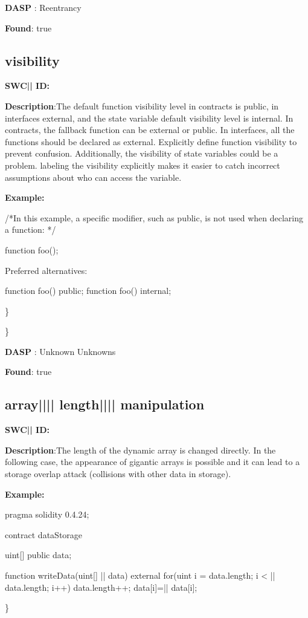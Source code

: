 \documentclass{article}
\begin{document}
\textbf{DASP} : Reentrancy

\textbf{Found}: true

\subsection{visibility} 
\textbf{SWC{|\textunderscore| }ID:} 

\textbf{Description}:The default function visibility level in contracts is public, in interfaces {\textendash} external,  and the state variable default visibility level is internal. In contracts, the fallback function can be external or public. In interfaces, all the functions should be declared as external. Explicitly define function visibility to prevent confusion.
Additionally, the visibility of state variables could be a problem. labeling the visibility explicitly makes it easier to catch incorrect assumptions about who can access the variable.


\textbf{Example:} 
\begin{ffcode} 

/*In this example, a specific modifier, such as public, is not used when declaring a function: */ 

function foo();

Preferred alternatives:

function foo() public;
function foo() internal;

\end{ffcode} 
\} 

\} 

\textbf{DASP} : Unknown Unknowns

\textbf{Found}: true

\subsection{array{||\textunderscore|| }length{||\textunderscore|| }manipulation} 
\textbf{SWC{|\textunderscore| }ID:} 

\textbf{Description}:The length of the dynamic array is changed directly. In the following case, the appearance of gigantic arrays is possible and it can lead to a storage overlap attack (collisions with other data in storage).


\textbf{Example:} 
\begin{ffcode} 

pragma solidity 0.4.24;

contract dataStorage {
    uint[] public data;

    function writeData(uint[] |\textunderscore| data) external {
        for(uint i = data.length; i < |\textunderscore| data.length; i++) {
            data.length++;
            data[i]=|\textunderscore| data[i];
        }
    }
}

\end{ffcode} 
\} 
\end{document}
